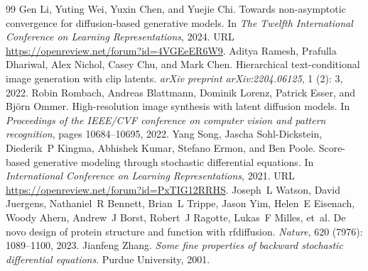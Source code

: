 \documentclass[10pt,a4paper]{amsart}
\begin{document}
\begin{thebibliography}{99}
 Gen Li, Yuting Wei, Yuxin Chen, and Yuejie Chi. Towards non-asymptotic convergence for diffusion-based generative models. In \emph{The Twelfth International Conference on Learning Representations}, 2024. URL \url{https://openreview.net/forum?id=4VGEeER6W9}.
 Aditya Ramesh, Prafulla Dhariwal, Alex Nichol, Casey Chu, and Mark Chen. Hierarchical text-conditional image generation with clip latents. \emph{arXiv preprint arXiv:2204.06125}, 1 (2): 3, 2022.
 Robin Rombach, Andreas Blattmann, Dominik Lorenz, Patrick Esser, and Bj{\"o}rn Ommer. High-resolution image synthesis with latent diffusion models. In \emph{Proceedings of the IEEE/CVF conference on computer vision and pattern recognition}, pages 10684--10695, 2022.
 Yang Song, Jascha Sohl-Dickstein, Diederik~P Kingma, Abhishek Kumar, Stefano Ermon, and Ben Poole. Score-based generative modeling through stochastic differential equations. In \emph{International Conference on Learning Representations}, 2021. URL \url{https://openreview.net/forum?id=PxTIG12RRHS}.
 Joseph~L Watson, David Juergens, Nathaniel~R Bennett, Brian~L Trippe, Jason Yim, Helen~E Eisenach, Woody Ahern, Andrew~J Borst, Robert~J Ragotte, Lukas~F Milles, et~al. De novo design of protein structure and function with rfdiffusion. \emph{Nature}, 620 (7976): 1089--1100, 2023.
 Jianfeng Zhang. \emph{Some fine properties of backward stochastic differential equations}. Purdue University, 2001.
\end{thebibliography}
\end{document}
